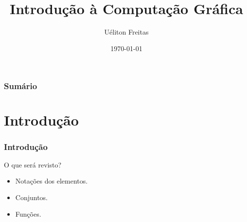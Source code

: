 \documentclass{beamer}
\title[Computação Gráfica]{Introdução à Computação Gráfica} %
\author{Uéliton Freitas} %
\institute[UFMS] %
{
Universidade Católica Don Bosco - UCDB \\ %
\medskip
\textit{freitas.ueliton@gmail.com} %
}
\date{\today} %
\begin{document}
\begin{frame}
\titlepage %
\end{frame}

\begin{frame}
\frametitle{Sumário} %
\tableofcontents %
\end{frame}





\section{Introdução} 


\begin{frame}
\frametitle{Introdução}


	\begin{block}{O que será revisto?}
		\begin{itemize}
			\item Notações dos elementos.
			\item Conjuntos.
			\item Funções.
		\end{itemize}
	\end{block}
	
\end{frame}
\end{document}
